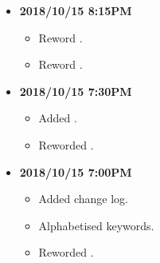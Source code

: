 \documentclass[../gazprea.tex]{subfiles}
\begin{document}
\begin{itemize}
  \item
    \textbf{2018/10/15 8:15PM}
    \begin{itemize}
      \item Reword .
      \item Reword .
    \end{itemize}
  \item
    \textbf{2018/10/15 7:30PM}
    \begin{itemize}
      \item Added .
      \item Reworded .
    \end{itemize}
  \item
    \textbf{2018/10/15 7:00PM}
    \begin{itemize}
      \item Added change log.
      \item Alphabetised keywords.
      \item Reworded .
    \end{itemize}
\end{itemize}
\end{document}
